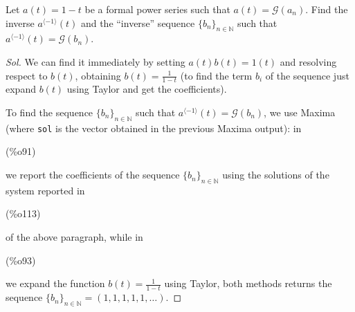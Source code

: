 \begin{exercise}
  Let $a(t) = 1-t$ be a formal power series such that $a(t) =
  \mathcal{G} (a_n)$. Find the inverse $a^{\langle -1\rangle}(t)$ and
  the ``inverse'' sequence $\{b_n\}_{n\in\mathbb{N} } $ such that
  $a^{\langle -1\rangle}(t) = \mathcal{G}(b_n) $.
\end{exercise}
\begin{proof}[Sol]
  We can find it immediately by setting $a(t)b(t)=1(t)$ and resolving
  respect to $b(t)$, obtaining $b(t) = \frac{1}{1-t} $ (to find the
  term $b_i$ of the sequence just expand $b(t)$ using Taylor and get
  the coefficients).

  To find the sequence $\{b_n\}_{n\in\mathbb{N} } $ such that
  $a^{\langle -1\rangle}(t) = \mathcal{G}(b_n) $, we use Maxima (where
  \texttt{\color{blue}sol} is the vector obtained in the previous
  Maxima output): in \parbox{8ex}{\color{labelcolor}(\%o91) } we
  report the coefficients of the sequence $\{b_n\}_{n\in\mathbb{N} } $
  using the solutions of the system reported
  in \parbox{8ex}{\color{labelcolor}(\%o113) } of the above paragraph,
  while in \parbox{8ex}{\color{labelcolor}(\%o93) } we expand the
  function $b(t) = \frac{1}{1-t} $ using Taylor, both methods returns
  the sequence $\{b_n\}_{n\in\mathbb{N} } = (1,1,1,1,1,\ldots)$.
  

\end{proof}
